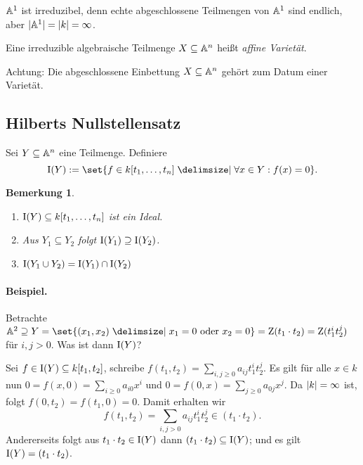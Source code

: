 \documentclass[12pt,a4paper]{scrartcl}
\theoremstyle{cplain}
\theoremstyle{cdef}
\newtheorem{beme}[thmcounter]{Bemerkung}
\begin{document}
\begin{bsp}
	$\mathbb A^1$ ist irreduzibel, denn echte abgeschlossene Teilmengen von $\mathbb A^1$ sind endlich, aber $\lvert\mathbb A^1\rvert = \lvert k\rvert = \infty$.
\end{bsp}
\begin{defi}
	Eine irreduzible algebraische Teilmenge $X\subseteq \mathbb A^n$ heißt \emph{affine Varietät}.
	
	Achtung: Die abgeschlossene Einbettung $X\subseteq \mathbb A^n$ gehört zum Datum einer Varietät.
\end{defi}
\subsection{Hilberts Nullstellensatz}
\begin{defi}
	Sei $Y\subseteq \mathbb A^n$ eine Teilmenge. Definiere
	\[\I(Y) := \set{f\in k[t_1,\dots, t_n]\given \forall x\in Y: f(x) = 0}.\]
\end{defi}
\begin{beme}
	\leavevmode
	\begin{enumerate} 
		\item $\operatorname{I}(Y) \subseteq k[t_1,\dots, t_n]$ ist ein Ideal.
		\item Aus $Y_1\subseteq Y_2$ folgt $\operatorname{I}(Y_1)\supseteq \operatorname{I}(Y_2)$.
		\item $\operatorname{I}(Y_1\cup Y_2) = \operatorname{I}(Y_1)\cap \operatorname{I}(Y_2)$
	\end{enumerate}
\end{beme}

\noindent
\paragraph{Beispiel.}
	Betrachte $\IA^2 \supseteq Y = \set {(x_1,x_2)\given x_1 = 0\text{ oder } x_2 = 0} = \Z(t_1\cdot t_2) = \Z(t_1^it_2^j)$ für $i,j>0$. Was ist dann $\operatorname{I}(Y)$?
	
	Sei $f\in \operatorname{I}(Y)\subseteq k[t_1,t_2]$, schreibe $f(t_1,t_2) = \sum_{i,j\ge 0}a_{ij}t_1^it_2^j$. Es gilt für alle $x\in k$ nun $0 = f(x,0) = \sum_{i\ge0}a_{i0}x^i$ und $0 = f(0,x) = \sum_{j\ge 0} a_{0j}x^j$. Da $\lvert k\rvert = \infty $ ist, folgt $f(0,t_2) = f(t_1,0) = 0$. Damit erhalten wir
	\[f(t_1,t_2) = \sum_{i,j>0}a_{ij}t_1^it_2^j\in (t_1\cdot t_2).\]
	Andererseits folgt aus $t_1\cdot t_2\in \operatorname{I}(Y)$ dann $(t_1\cdot t_2)\subseteq \operatorname{I}(Y)$; und es gilt $\operatorname{I}(Y) = (t_1\cdot t_2)$.
\end{document}
